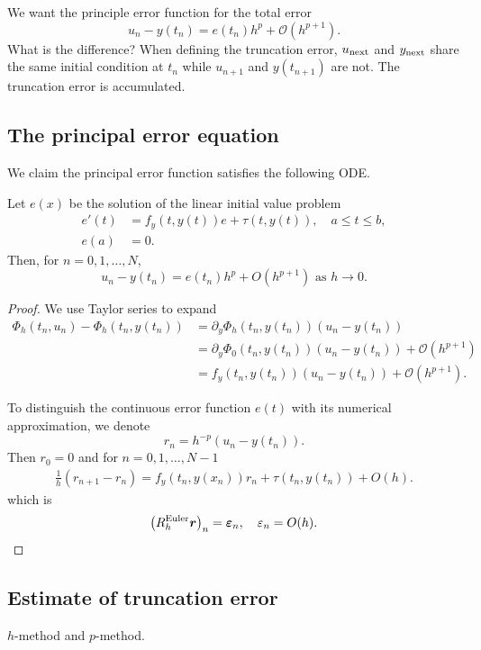 \documentclass[10pt]{amsart}
\begin{document}
We want the principle error function for the total error
$$
u_n - y(t_n) = e(t_n) h^p + \mathcal O(h^{p+1}).
$$
What is the difference? When defining the truncation error, $u_{\rm next}$ and $y_{\rm next}$ share the same initial condition at $t_n$ while $u_{n+1}$ and $y(t_{n+1})$ are not. The truncation error is accumulated. 

\subsection{The principal error equation}
We claim the principal error function satisfies the following ODE.
\begin{theorem}
Let $e(x)$ be the solution of the linear initial value problem
$$
\begin{aligned}
e'(t)& =f_y(t, {y}(t)) e+{\tau}(t, {y}(t)), \quad a \leq t \leq b, \\
e(a) & = 0.
\end{aligned}
$$
Then, for $n=0,1, \ldots, N$,
$$
{u}_n-{y}\left(t_n\right)=e\left(t_n\right) h^p+O\left(h^{p+1}\right) \text { as } h \rightarrow 0.
$$
\end{theorem}
\begin{proof}
We use Taylor series to expand
$$
\begin{aligned}
\Phi_h(t_n, u_n) - \Phi_h(t_n, y(t_n)) &= \partial_y\Phi_h(t_n, y(t_n))( u_n - y(t_n))\\
&= \partial_y\Phi_0(t_n, y(t_n))( u_n - y(t_n)) + \mathcal O(h^{p+1})\\
&= f_y(t_n, y(t_n))( u_n - y(t_n)) + \mathcal O(h^{p+1}).
\end{aligned}
$$

To distinguish the continuous error function $e(t)$ with its numerical approximation, we denote
$$
r_n = h^{-p} ({u}_n-{y}\left(t_n\right)). 
$$
Then $r_0 = 0$ and for $n=0,1, \ldots, N-1$
$$
\begin{gathered}
\frac{1}{h}\left(r_{n+1}-r_n\right)=f_y\left(t_n, {y}\left(x_n\right)\right) r_n+{\tau}\left(t_n, {y}\left(t_n\right)\right)+O(h).
\end{gathered}
$$
which is
$$
\left(R_h^{\text {Euler}} \boldsymbol r\right)_n=\boldsymbol{\varepsilon}_n, \quad  \varepsilon_n=O(h).
$$
\end{proof}

\subsection{Estimate of truncation error}
$h$-method and $p$-method.



 
\end{document}
